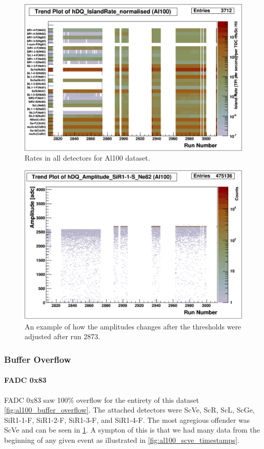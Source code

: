 \documentclass[a4paper]{article}
\begin{document}
\begin{figure}
  \centering
  \includegraphics[width=0.9\linewidth]{figs/al100/rates}
  \caption{Rates in all detectors for Al100 dataset.}
  \label{fig:al100_rates}
\end{figure}

\begin{figure}
  \centering
  \includegraphics[width=0.9\linewidth]{figs/al100/sir11s_amps}
  \caption{An example of how the amplitudes changes after the thresholds
    were adjusted after run 2873.}
  \label{fig:al100_sir11s_amps}
\end{figure}

\subsubsection{Buffer Overflow}
\label{sec:al100_buffer_overflow}
\paragraph{FADC 0x83}
FADC 0x83 saw 100\% overflow for the entirety of this dataset \ref{fig:al100_buffer_overflow}.
The attached detectors were ScVe, ScR, ScL, ScGe, SiR1-1-F, SiR1-2-F, SiR1-3-F, and SiR1-4-F.
The most agregious offender was ScVe and can be seen in \ref{fig:al100_rates}. A sympton of this
is that we had many data from the beginning of any given event as illustrated in
\ref{fig:al100_scve_timestamps}.
\end{document}
